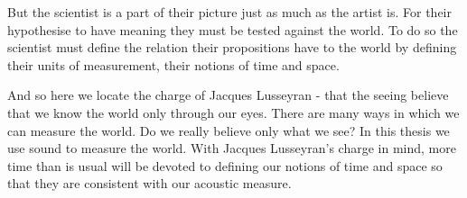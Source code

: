 %
%
%
%
%
%
%
%
%

But the scientist is a part of their picture just as much as the artist is.
For their hypothesise to have meaning they must be tested against the world.
To do so the scientist must define the relation their propositions have to the world by defining their units of measurement, their notions of time and space.

And so here we locate the charge of Jacques Lusseyran - that the seeing believe that we know the world only through our eyes.
There are many ways in which we can measure the world.  
Do we really believe only what we see?
In this thesis we use sound to measure the world.  
With Jacques Lusseyran's charge in mind, more time than is usual will be devoted to defining our notions of time and space so that they are consistent with our acoustic measure.






